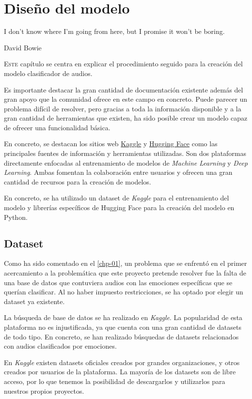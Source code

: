 \chapter{Diseño del modelo}\label{chp-02}
\epigraph{I don't know where I'm going from here, but I promise it won't be boring.}{David Bowie}
\lettrine[lraise=-0.1, lines=2, loversize=0.2]{E}{ste} capítulo se centra en explicar el procedimiento seguido para la creación del modelo clasificador de audios.

Es importante destacar la gran cantidad de documentación existente además del gran apoyo que la comunidad ofrece en este campo en concreto.
Puede parecer un problema difícil de resolver, pero gracias a toda la información disponible y a la gran cantidad de herramientas que existen, ha sido posible crear un modelo capaz de ofrecer una funcionalidad básica.

En concreto, se destacan los sitios web \href{https://www.kaggle.com/}{Kaggle} y \href{https://huggingface.co/}{Hugging Face} como las principales fuentes de información y herramientas utilizadas.
Son dos plataformas directamente enfocadas al entrenamiento de modelos de \textit{Machine Learning} y \textit{Deep Learning}.
Ambas fomentan la colaboración entre usuarios y ofrecen una gran cantidad de recursos para la creación de modelos.

En concreto, se ha utilizado un dataset de \textit{Kaggle} para el entrenamiento del modelo y librerías específicos de Hugging Face para la creación del modelo en Python.


\section{Dataset}\label{seccion:dataset}
Como ha sido comentado en el \autoref{chp-01}, un problema que se enfrentó en el primer acercamiento a la problemática que este proyecto pretende resolver fue la falta de una base de datos que contuviera audios con las emociones específicas que se querían clasificar.
Al no haber impuesto restricciones, se ha optado por elegir un dataset ya existente.

La búsqueda de base de datos se ha realizado en \textit{Kaggle}.
La popularidad de esta plataforma no es injustificada, ya que cuenta con una gran cantidad de datasets de todo tipo.
En concreto, se han realizado búsquedas de datasets relacionados con audios clasificados por emociones.

En \textit{Kaggle} existen datasets oficiales creados por grandes organizaciones, y otros creados por usuarios de la plataforma.
La mayoría de los datasets son de libre acceso, por lo que tenemos la posibilidad de descargarlos y utilizarlos para nuestros propios proyectos.


